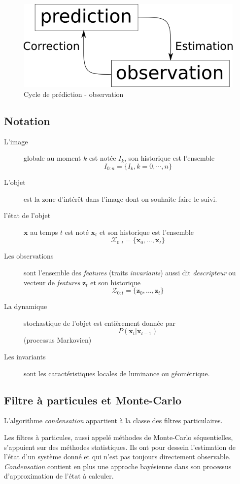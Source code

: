 \documentclass[a4paper,11pt]{report}
\begin{document}
\begin{figure}[H]

\includegraphics[scale=0.5]{figurePredictionObservationCycle.png}
\centering
\caption{Cycle de prédiction - observation}
\end{figure}

\subsection{Notation}
\begin{description}
\item[L'image] globale au moment $k$ est notée $I_k$, son historique est l'ensemble $$I_{0:n}=\{I_k, k=0,\cdots,n\}$$
\item[L'objet] est la zone d'intérêt dans l'image dont on souhaite faire le suivi.
\item[l'état de l'objet] $\mathbf{x}$ au temps $t$ est noté $\mathbf{x}_t$ et son historique est l'ensemble $$\mathcal{X}_{0:t} = \{\mathbf{x}_0,...,\mathbf{x}_t\}$$
\item[Les observations] sont l'ensemble des \textit{features} (traits \textit{invariants}) aussi dit \emph{descripteur} ou vecteur de \textit{features} $\mathbf{z}_t$ et son historique $$ \mathcal{Z}_{0:t}=\{\mathbf{z}_0,...,\mathbf{z}_t\}$$
\item[La dynamique] stochastique de l'objet est entièrement donnée par $$P(\mathbf{x}_t|\mathbf{x}_{t-1})$$ (processus Markovien)
\item[Les invariants] sont les caractéristiques locales de luminance ou géométrique.
\end{description}

\subsection{Filtre à particules et Monte-Carlo}
L'algorithme \textit{condensation} appartient à la classe des filtres particulaires. 

Les filtres à particules, aussi appelé méthodes  de Monte-Carlo séquentielles, s'appuient sur des méthodes statistiques. Ils ont pour dessein l'estimation de l'état d'un système donné et qui n'est pas toujours directement observable.
\textit{Condensation} contient en plus une approche bayésienne dans son processus d'approximation de l'état à calculer.\\
\end{document}
